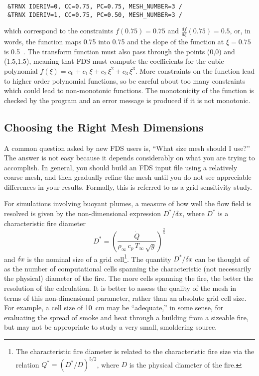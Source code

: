\documentclass[11pt]{book}
\newcommand{\dx}{\delta x}
\newcommand{\dQ}{\dot{Q}}
\newcommand{\be}{\begin{equation}}
\newcommand{\ee}{\end{equation}}
\begin{document}
\footnotesize
\begin{verbatim}
 &TRNX IDERIV=0, CC=0.75, PC=0.75, MESH_NUMBER=3 /
 &TRNX IDERIV=1, CC=0.75, PC=0.50, MESH_NUMBER=3 /
\end{verbatim} \normalsize

\noindent
which correspond to the constraints
$f(0.75)=0.75$ and $\frac{df}{d\xi}(0.75) = 0.5$, or, in words, the
function maps 0.75 into 0.75 and the slope of the function at
$\xi=0.75$ is 0.5~.
The transform function must also pass through the points (0,0) and (1.5,1.5), meaning that
FDS must compute the coefficients for the
cubic polynomial $f(\xi) = c_0 + c_1 \, \xi + c_2 \, \xi^2 + c_3 \, \xi^3$.
More constraints on the function lead to higher order polynomial functions, so be careful about too many constraints which could lead
to non-monotonic functions.
The monotonicity of the function is checked by the
program and an error message is produced if it is not monotonic.


\subsection{Choosing the Right Mesh Dimensions}

A common question asked by new FDS users is, ``What size mesh should I use?''  The answer is not easy because it depends considerably on what you are trying
to accomplish. In general, you should build an FDS input file using a relatively coarse mesh, and then gradually refine the mesh until you do not see
appreciable differences in your results. Formally, this is referred to as a grid sensitivity study.

For simulations involving buoyant plumes, a measure of how well the flow field is resolved is given by the
non-dimensional expression $D^*/\dx$, where $D^*$ is a characteristic
fire diameter
\be D^* = \left(
     \frac{\dQ}{\rho_\infty \, c_p \, T_\infty \, \sqrt{g} }
     \right)^\frac{2}{5}  \ee
and $\dx$ is the nominal size of a grid cell\footnote{The characteristic
fire diameter is related to the characteristic fire size via the
relation $Q^* = (D^*/D)^{5/2}$, where $D$ is the physical diameter of the
fire.}. The quantity $D^*/\dx$
can be thought of as the number of computational cells spanning the
characteristic (not necessarily the physical) diameter of the fire.
The more cells spanning the fire, the better the resolution of the
calculation. It is better to assess the quality of the mesh in terms of this non-dimensional parameter, rather than
an absolute grid cell size. For example, a cell size of 10~cm may be ``adequate,'' in some sense, for evaluating the spread of smoke and heat
through a building from a sizeable fire, but may not be appropriate to study a very small, smoldering source.
\end{document}
